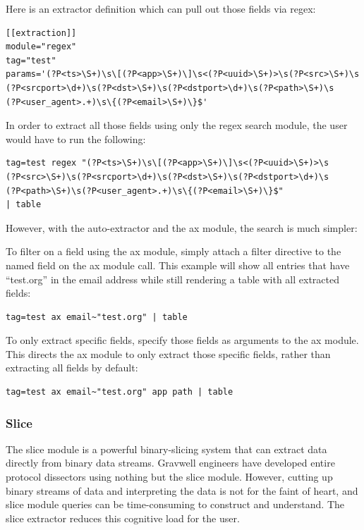 Here is an extractor definition which can pull out those fields via
regex:

\begin{Verbatim}[breaklines=true]
[[extraction]]
module="regex"
tag="test"
params='(?P<ts>\S+)\s\[(?P<app>\S+)\]\s<(?P<uuid>\S+)>\s(?P<src>\S+)\s
(?P<srcport>\d+)\s(?P<dst>\S+)\s(?P<dstport>\d+)\s(?P<path>\S+)\s
(?P<user_agent>.+)\s\{(?P<email>\S+)\}$'
\end{Verbatim}

In order to extract all those fields using only the regex search
module, the user would have to run the following:

\begin{Verbatim}[breaklines=true]
tag=test regex "(?P<ts>\S+)\s\[(?P<app>\S+)\]\s<(?P<uuid>\S+)>\s
(?P<src>\S+)\s(?P<srcport>\d+)\s(?P<dst>\S+)\s(?P<dstport>\d+)\s
(?P<path>\S+)\s(?P<user_agent>.+)\s\{(?P<email>\S+)\}$" 
| table
\end{Verbatim}

However, with the auto-extractor and the ax module, the search is much
simpler:


To filter on a field using the ax module, simply attach a filter
directive to the named field on the ax module call. This example will
show all entries that have ``test.org'' in the email address while still
rendering a table with all extracted fields:

\begin{Verbatim}[breaklines=true]
tag=test ax email~"test.org" | table
\end{Verbatim}

To only extract specific fields, specify those fields as arguments to
the ax module. This directs the ax module to only extract those specific
fields, rather than extracting all fields by default:

\begin{Verbatim}[breaklines=true]
tag=test ax email~"test.org" app path | table
\end{Verbatim}

\subsubsection{Slice}

The slice module is a powerful binary-slicing system that can extract
data directly from binary data streams. Gravwell engineers have
developed entire protocol dissectors using nothing but the slice module.
However, cutting up binary streams of data and interpreting the data is
not for the faint of heart, and slice module queries can be
time-consuming to construct and understand. The slice extractor reduces
this cognitive load for the user.

